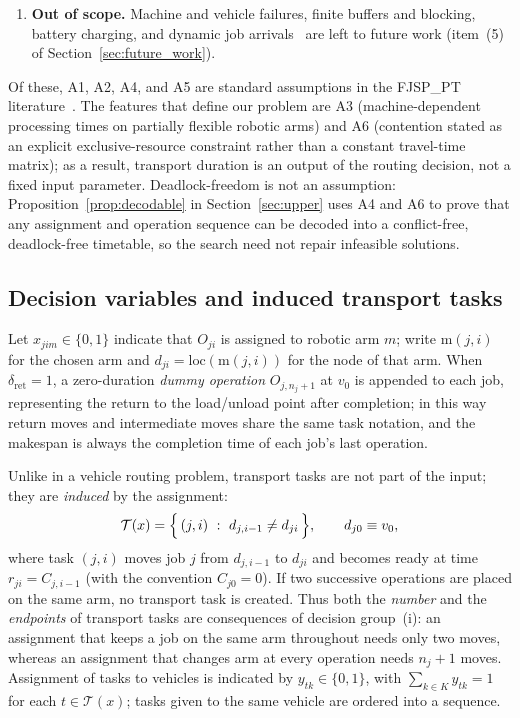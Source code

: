 \begin{enumerate}[label=\textbf{A\arabic*.},leftmargin=*,topsep=2pt,itemsep=2pt]
\item \textbf{Out of scope.} Machine and vehicle failures, finite buffers and blocking, battery charging, and dynamic
job arrivals~\cite{gui2023dynamic,xiong2024dynamic} are left to future work (item~(5) of Section~\ref{sec:future_work}).
\end{enumerate}

Of these, A1, A2, A4, and A5 are standard assumptions in the FJSP\_PT literature~\cite{xin2025review}. The features that define our problem are A3 (machine-dependent processing times on partially flexible robotic arms) and A6 (contention stated as an explicit exclusive-resource constraint rather than a constant travel-time matrix);
as a result, transport duration is an output of the routing decision, not a fixed input parameter.
Deadlock-freedom is not an assumption: Proposition~\ref{prop:decodable} in Section~\ref{sec:upper} uses A4 and A6 to prove that any assignment and operation sequence can be decoded into a conflict-free, deadlock-free timetable, so the search need not repair infeasible solutions.

\subsection{Decision variables and induced transport tasks}

Let $x_{jim}\in\{0,1\}$ indicate that $O_{ji}$ is assigned to robotic arm $m$; write $\mathrm{m}(j,i)$ for the chosen arm and
$d_{ji}=\mathrm{loc}(\mathrm{m}(j,i))$ for the node of that arm. When $\delta_{\mathrm{ret}}=1$,
a zero-duration \emph{dummy operation} $O_{j,n_j+1}$ at $v_0$ is appended to each job, representing the return to the load/unload point after completion;
in this way return moves and intermediate moves share the same task notation, and the makespan is always the completion time of each job's last operation.

Unlike in a vehicle routing problem, transport tasks are not part of the input; they are \emph{induced} by the assignment:
\begin{equation}
\label{eq:tasks}
\mathcal{T}(x)=\Bigl\{\,(j,i)\ :\ d_{j,i-1}\neq d_{ji}\,\Bigr\},
\qquad d_{j0}\equiv v_0 ,
\end{equation}
where task $(j,i)$ moves job $j$ from $d_{j,i-1}$ to $d_{ji}$ and becomes ready at time
$r_{ji}=C_{j,i-1}$ (with the convention $C_{j0}=0$). If two successive operations are placed on the same arm, no
transport task is created. Thus both the \emph{number} and the \emph{endpoints} of transport tasks are consequences of decision group~(i): an assignment that keeps a job
on the same arm throughout needs only two moves, whereas an assignment that changes arm at every operation needs $n_j+1$ moves.
Assignment of tasks to vehicles is indicated by $y_{tk}\in\{0,1\}$, with
$\sum_{k\in K}y_{tk}=1$ for each $t\in\mathcal{T}(x)$; tasks given to the same vehicle are ordered into a sequence.

